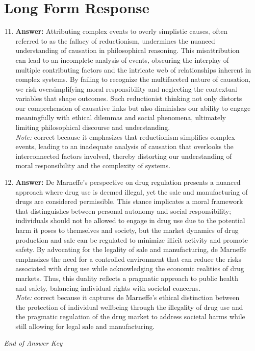 \documentclass[12pt]{article}
\begin{document}
\section*{Long Form Response}
\begin{enumerate}[label=\arabic*.]
\setcounter{enumi}{10}
\item \textbf{Answer:} Attributing complex events to overly simplistic causes, often referred to as the fallacy of reductionism, undermines the nuanced understanding of causation in philosophical reasoning. This misattribution can lead to an incomplete analysis of events, obscuring the interplay of multiple contributing factors and the intricate web of relationships inherent in complex systems. By failing to recognize the multifaceted nature of causation, we risk oversimplifying moral responsibility and neglecting the contextual variables that shape outcomes. Such reductionist thinking not only distorts our comprehension of causative links but also diminishes our ability to engage meaningfully with ethical dilemmas and social phenomena, ultimately limiting philosophical discourse and understanding.
\\ \textit{Note:} correct because it emphasizes that reductionism simplifies complex events, leading to an inadequate analysis of causation that overlooks the interconnected factors involved, thereby distorting our understanding of moral responsibility and the complexity of systems.
\item \textbf{Answer:} De Marneffe's perspective on drug regulation presents a nuanced approach where drug use is deemed illegal, yet the sale and manufacturing of drugs are considered permissible. This stance implicates a moral framework that distinguishes between personal autonomy and social responsibility; individuals should not be allowed to engage in drug use due to the potential harm it poses to themselves and society, but the market dynamics of drug production and sale can be regulated to minimize illicit activity and promote safety. By advocating for the legality of sale and manufacturing, de Marneffe emphasizes the need for a controlled environment that can reduce the risks associated with drug use while acknowledging the economic realities of drug markets. Thus, this duality reflects a pragmatic approach to public health and safety, balancing individual rights with societal concerns.
\\ \textit{Note:} correct because it captures de Marneffe's ethical distinction between the protection of individual wellbeing through the illegality of drug use and the pragmatic regulation of the drug market to address societal harms while still allowing for legal sale and manufacturing.
\end{enumerate}

\vfill
\noindent\textit{End of Answer Key}
\end{document}
